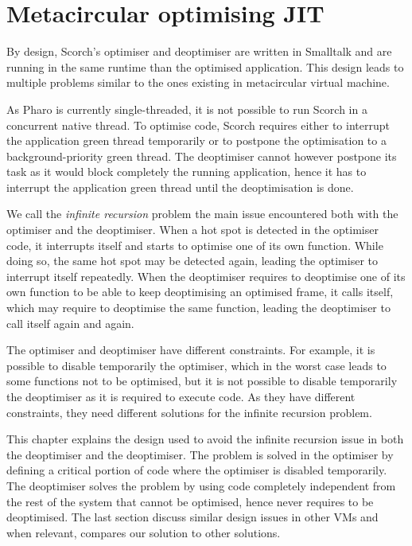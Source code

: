 \documentclass[a4paper,12pt,twoside]{../includes/ThesisStyle}
\begin{document}
\fi

\chapter{Metacircular optimising JIT}
\label{chap:metacircular}
\minitoc

By design, Scorch's optimiser and deoptimiser are written in Smalltalk and are running in the same runtime than the optimised application. This design leads to multiple problems similar to the ones existing in metacircular virtual machine. 

As Pharo is currently single-threaded, it is not possible to run Scorch in a concurrent native thread. To optimise code, Scorch requires either to interrupt the application green thread temporarily or to postpone the optimisation to a background-priority green thread. The deoptimiser cannot however postpone its task as it would block completely the running application, hence it has to interrupt the application green thread until the deoptimisation is done.

We call the \emph{infinite recursion} problem the main issue encountered both with the optimiser and the deoptimiser. When a hot spot is detected in the optimiser code, it interrupts itself and starts to optimise one of its own function. While doing so, the same hot spot may be detected again, leading the optimiser to interrupt itself repeatedly. When the deoptimiser requires to deoptimise one of its own function to be able to keep deoptimising an optimised frame, it calls itself, which may require to deoptimise the same function, leading the deoptimiser to call itself again and again.

The optimiser and deoptimiser have different constraints. For example, it is possible to disable temporarily the optimiser, which in the worst case leads to some functions not to be optimised, but it is not possible to disable temporarily the deoptimiser as it is required to execute code. As they have different constraints, they need different solutions for the infinite recursion problem.

This chapter explains the design used to avoid the infinite recursion issue in both the deoptimiser and the deoptimiser. The problem is solved in the optimiser by defining a critical portion of code where the optimiser is disabled temporarily. The deoptimiser solves the problem by using code completely independent from the rest of the system that cannot be optimised, hence never requires to be deoptimised. The last section discuss similar design issues in other VMs and when relevant, compares our solution to other solutions.
\end{document}
